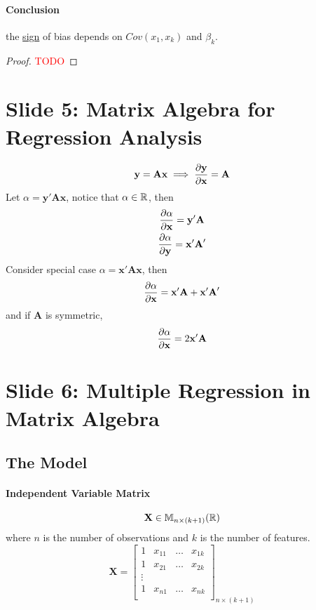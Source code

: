 \documentclass[]{article}
\begin{document}
    \paragraph{Conclusion} the \ul{sign} of bias depends on $Cov(x_1, x_k)$ and $\beta_k$.
    
    \begin{proof}
    	\textcolor{red}{TODO}
    \end{proof}
    
    \section{Slide 5: Matrix Algebra for Regression Analysis}
    	\begin{equation}
    		\textbf{y} = \textbf{A} \textbf{x} \implies \frac{\partial{\textbf{y}}}{\partial{\textbf{x}}} = \textbf{A}
    	\end{equation}
    	Let $\alpha = \textbf{y}' \textbf{A} \textbf{x}$, notice that $\alpha \in \mathbb{R}$, then 
    	\begin{gather}
    		\frac{\partial{\alpha}}{\partial{\textbf{x}}} = \textbf{y}' \textbf{A} \\
    		\frac{\partial{	\alpha}}{\partial{\textbf{y}}} = \textbf{x}' \textbf{A}'
    	\end{gather}
    	Consider special case $\alpha = \textbf{x}' \textbf{A} \textbf{x}$, then 
    	\begin{equation}
    		\frac{\partial{\alpha}}{\partial{\textbf{x}}} = \textbf{x}' \textbf{A} + \textbf{x}' \textbf{A}'
    	\end{equation}
    	and if $\textbf{A}$ is symmetric, 
    	\begin{equation}
    		\frac{\partial{\alpha}}{\partial{\textbf{x}}} = 2 \textbf{x}' \textbf{A}
    	\end{equation}
    
    \section{Slide 6: Multiple Regression in Matrix Algebra}
    	\subsection{The Model}
    		\paragraph{Independent Variable Matrix}
    			\[
    				\textbf{X} \in \mathbb{M}_{n \times (k+1)}(\mathbb{R})
    			\]
    			where $n$ is the number of observations and $k$ is the number of features.
    			\[
    				\textbf{X} = \begin{bmatrix}
    					1 & x_{11} & \dots & x_{1k} \\
    					1 & x_{21} & \dots & x_{2k} \\
    					\vdots \\
    					1 & x_{n1} & \dots & x_{nk} \\
    				\end{bmatrix}_{n \times (k+1)}
    			\]
\end{document}
